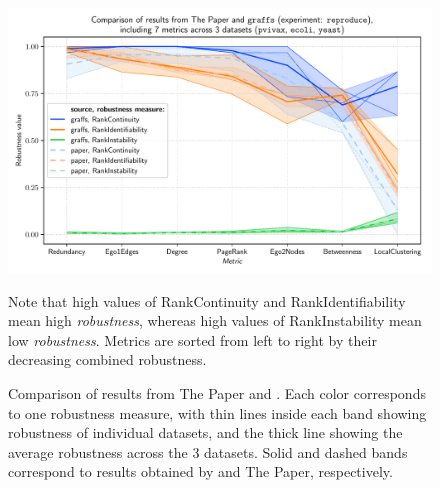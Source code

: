 \begin{figure}
    \includegraphics[width=\linewidth]{plot_reproduction.pdf}
    \vspace*{-0.6cm}
    \caption{Comparison of results from The Paper and \graffs.
    Each color corresponds to one robustness measure, with thin lines inside each band showing robustness of individual datasets, and the thick line showing the average robustness across the 3 datasets.
    Solid and dashed bands correspond to results obtained by \graffs and The Paper, respectively.}
    \label{fig:plot_reproduction}
    \footnotesize
    \begin{flushleft}
        Note that high values of RankContinuity and RankIdentifiability mean high \textsl{robustness}, whereas high values of RankInstability mean low \textsl{robustness}.
        Metrics are sorted from left to right by their decreasing combined robustness.
    \end{flushleft}
\end{figure}
